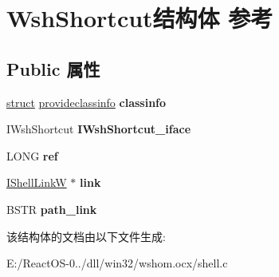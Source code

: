 \hypertarget{struct_wsh_shortcut}{}\section{Wsh\+Shortcut结构体 参考}
\label{struct_wsh_shortcut}
\subsection*{Public 属性}
\begin{DoxyCompactItemize}
\item 
\mbox{\label{struct_wsh_shortcut_a8e286a592da40a4a4455f77143d30ea0}} 
\hyperlink{interfacestruct}{struct} \hyperlink{structprovideclassinfo}{provideclassinfo} {\bfseries classinfo}
\item 
\mbox{\label{struct_wsh_shortcut_a3e9bf9ed43474a329bbddf6ba32a3c71}} 
I\+Wsh\+Shortcut {\bfseries I\+Wsh\+Shortcut\+\_\+iface}
\item 
\mbox{\label{struct_wsh_shortcut_a6534431329a0ff318752d6a605127a4b}} 
L\+O\+NG {\bfseries ref}
\item 
\mbox{\label{struct_wsh_shortcut_a71af929de960ba8e3cd273f123b39414}} 
\hyperlink{interface_i_shell_link_w}{I\+Shell\+LinkW} $\ast$ {\bfseries link}
\item 
\mbox{\label{struct_wsh_shortcut_a0818377ee732979076ec408ca8dc768c}} 
B\+S\+TR {\bfseries path\+\_\+link}
\end{DoxyCompactItemize}


该结构体的文档由以下文件生成\+:\begin{DoxyCompactItemize}
\item 
E\+:/\+React\+O\+S-\/0../dll/win32/wshom.\+ocx/shell.\+c\end{DoxyCompactItemize}
